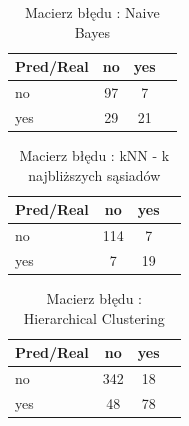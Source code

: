 \documentclass[twoside,twocolumn]{article}
\begin{document}
\begin{table}[hbt!]
\centering
\caption{Macierz błędu : Naive Bayes}
\begin{tabular}{l*{2}{c}r}
Pred/Real & no & yes \\
\hline
no & 97 & 7 \\
yes & 29 & 21 \\
\end{tabular}
\end{table}

\begin{table}[hbt!]
\centering
\caption{Macierz błędu : kNN - k najbliższych sąsiadów}
\begin{tabular}{l*{2}{c}r}
Pred/Real & no & yes \\
\hline
no & 114 & 7 \\
yes & 7 & 19 \\
\end{tabular}
\end{table}

\begin{table}[hbt!]
\centering
\caption{Macierz błędu : Hierarchical Clustering}
\begin{tabular}{l*{2}{c}r}
Pred/Real & no & yes \\
\hline
no & 342 & 18 \\
yes & 48 & 78 \\
\end{tabular}
\end{table}
\end{document}
